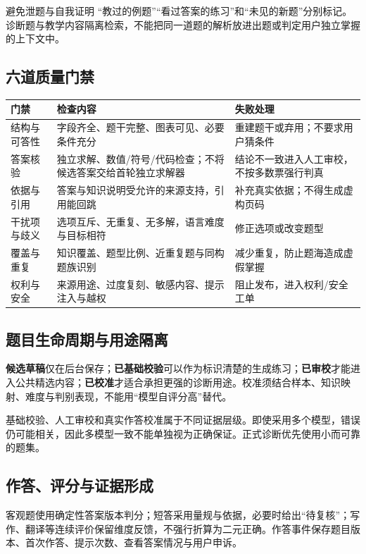 \documentclass[UTF8,a4paper,11pt,fontset=none]{ctexart}
\newcommand{\cth}[1]{\textbf{\sffamily #1}}
\newcommand{\cont}[1]{\clearpage\noindent{\small\sffamily\color{Muted}#1}\par\vspace{3pt}}
\newenvironment{tbl}{\par\vspace{3pt}\small\noindent\ignorespaces}{\unskip\par\vspace{5pt}}
\begin{document}
\begin{insight}{避免泄题与自我证明}
“教过的例题”“看过答案的练习”和“未见的新题”分别标记。诊断题与教学内容隔离检索，不能把同一道题的解析放进出题或判定用户独立掌握的上下文中。
\end{insight}

\cont{10 / 习题生成与质量控制（续）}
\subsection{六道质量门禁}
\begin{tbl}
\begin{tabularx}{\linewidth}{@{}L{25mm}YY@{}}
\toprule
\cth{门禁}&\cth{检查内容}&\cth{失败处理}\\\midrule
结构与可答性&字段齐全、题干完整、图表可见、必要条件充分&重建题干或弃用；不要求用户猜条件\\
答案核验&独立求解、数值/符号/代码检查；不将候选答案交给首轮独立求解器&结论不一致进入人工审校，不按多数票强行判真\\
依据与引用&答案与知识说明受允许的来源支持，引用能回跳&补充真实依据；不得生成虚构页码\\
干扰项与歧义&选项互斥、无重复、无多解，语言难度与目标相符&修正选项或改变题型\\
覆盖与重复&知识覆盖、题型比例、近重复题与同构题族识别&减少重复，防止题海造成虚假掌握\\
权利与安全&来源用途、过度复刻、敏感内容、提示注入与越权&阻止发布，进入权利/安全工单\\
\bottomrule
\end{tabularx}
\end{tbl}

\subsection{题目生命周期与用途隔离}
\textbf{候选草稿}仅在后台保存；\textbf{已基础校验}可以作为标识清楚的生成练习；\textbf{已审校}才能进入公共精选内容；\textbf{已校准}才适合承担更强的诊断用途。校准须结合样本、知识映射、难度与判别表现，不能用“模型自评分高”替代。

基础校验、人工审校和真实作答校准属于不同证据层级。即使采用多个模型，错误仍可能相关，因此多模型一致不能单独视为正确保证。正式诊断优先使用小而可靠的题集。

\subsection{作答、评分与证据形成}
客观题使用确定性答案版本判分；短答采用量规与依据，必要时给出“待复核”；写作、翻译等连续评价保留维度反馈，不强行折算为二元正确。作答事件保存题目版本、首次作答、提示次数、查看答案情况与用户申诉。
\end{document}
